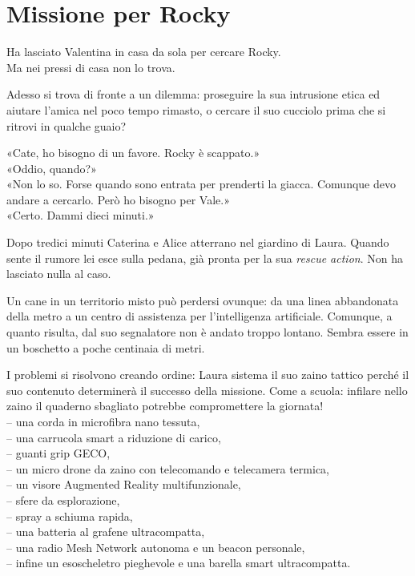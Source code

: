 \chapter{Missione per Rocky}

Ha lasciato Valentina in casa da sola per cercare Rocky.\\
Ma nei pressi di casa non lo trova.

\par\medskip
Adesso si trova di fronte a un dilemma: proseguire la sua intrusione etica ed aiutare l’amica nel poco tempo rimasto, o cercare il suo cucciolo prima che si ritrovi in qualche guaio?

\par\medskip
«Cate, ho bisogno di un favore. Rocky è scappato.»\\
«Oddio, quando?»\\
«Non lo so. Forse quando sono entrata per prenderti la giacca. Comunque devo andare a cercarlo. Però ho bisogno per Vale.»\\
«Certo. Dammi dieci minuti.»

\par\medskip
Dopo tredici minuti Caterina e Alice atterrano nel giardino di Laura. Quando sente il rumore lei esce sulla pedana, già pronta per la sua \emph{rescue action}. Non ha lasciato nulla al caso.

\par\medskip
Un cane in un territorio misto può perdersi ovunque: da una linea abbandonata della metro a un centro di assistenza per l’intelligenza artificiale. Comunque, a quanto risulta, dal suo segnalatore non è andato troppo lontano. Sembra essere in un boschetto a poche centinaia di metri.

\par\medskip
I problemi si risolvono creando ordine: Laura sistema il suo zaino tattico perché il suo contenuto determinerà il successo della missione. Come a scuola: infilare nello zaino il quaderno sbagliato potrebbe compromettere la giornata!\\
– una corda in microfibra nano tessuta,\\
– una carrucola smart a riduzione di carico,\\
– guanti grip GECO,\\
– un micro drone da zaino con telecomando e telecamera termica,\\
– un visore Augmented Reality multifunzionale,\\
– sfere da esplorazione,\\
– spray a schiuma rapida,\\
– una batteria al grafene ultracompatta,\\
– una radio Mesh Network autonoma e un beacon personale,\\
– infine un esoscheletro pieghevole e una barella smart ultracompatta.

